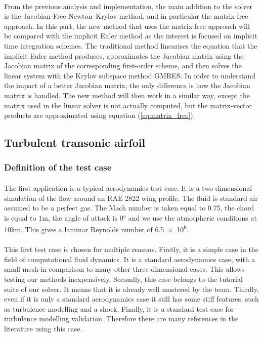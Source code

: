     \paragraph{}
    From the previous analysis and implementation, the main addition to the solver is the Jacobian-Free Newton--Krylov method, and in particular the matrix-free approach.
    In this part, the new method that uses the matrix-free approach will be compared with the implicit Euler method as the interest is focused on implicit time integration schemes.
    The traditional method linearises the equation that the implicit Euler method produces, approximates the Jacobian matrix using the Jacobian matrix of the corresponding first-order scheme, and then solves the linear system with the Krylov subspace method GMRES.
    In order to understand the impact of a better Jacobian matrix, the only difference is how the Jacobian matrix is handled.
    The new method will then work in a similar way, except the matrix used in the linear solver is not actually computed, but the matrix-vector products are approximated using equation (\ref{eq:matrix_free}).


    \subsection{Turbulent transonic airfoil}

      \subsubsection{Definition of the test case}

        \paragraph{}
        The first application is a typical aerodynamics test case.
        It is a two-dimensional simulation of the flow around an RAE 2822 wing profile.
        The fluid is standard air assumed to be a perfect gas.
        The Mach number is taken equal to 0.75, the chord is equal to $1\si{\meter}$, the angle of attack is $0\si{\degree}$ and we use the atmospheric conditions at 10km.
        This gives a laminar Reynolds number of \num{6.5e6}.

        \paragraph{}
        This first test case is chosen for multiple reasons.
        Firstly, it is a simple case in the field of computational fluid dynamics.
        It is a standard aerodynamics case, with a small mesh in comparison to many other three-dimensional cases.
        This allows testing our methods inexpensively.
        Secondly, this case belongs to the tutorial suite of our solver.
        It means that it is already well mastered by the team.
        Thirdly, even if it is only a standard aerodynamics case it still has some stiff features, such as turbulence modelling and a shock.
        Finally, it is a standard test case for turbulence modelling validation.
        Therefore there are many references in the literature using this case.


